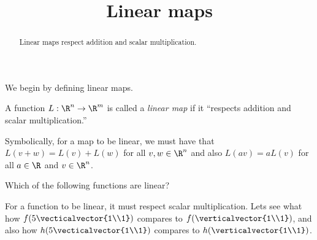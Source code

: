 \documentclass{ximera}
\title{Linear maps}
\begin{document}
\begin{abstract}
  Linear maps respect addition and scalar multiplication.
\end{abstract}

We begin by defining linear maps.

\begin{definition}
  A function $L: \R^n \to \R^m$ is called a \textit{linear map} if it
  ``respects addition and scalar multiplication.''

  Symbolically, for a map to be linear, we must have that $L(v+w) =
  L(v)+L(w)$ for all $v,w \in \R^n$ and also $L(av) = a L(v)$ for all
  $a \in \R$ and $v\in \R^n$.
\end{definition}

\begin{question}
  Which of the following functions are linear?
  \begin{solution}
    \begin{hint}
    	For a function to be linear, it must respect scalar multiplication.  Lets see what how $f(5 \vecticalvector{1\\1})$ compares to $f(\verticalvector{1\\1})$, and also how
	$h(5 \vecticalvector{1\\1})$ compares to $h(\verticalvector{1\\1})$.  
	

\end{hint}
\end{solution}
\end{question}
\end{document}
